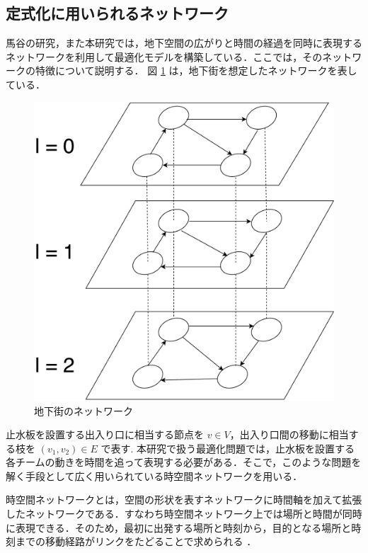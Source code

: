 \documentclass[a4paper,12pt,fleqn]{jarticle}
\begin{document}
\subsection{定式化に用いられるネットワーク}
馬谷の研究\cite{馬谷さん卒論}，また本研究では，地下空間の広がりと時間の経過を同時に表現するネットワークを利用して最適化モデルを構築している．ここでは，そのネットワークの特徴について説明する．
図 \ref{fig:nettowa-ku} は，地下街を想定したネットワークを表している．
\begin{figure}[H]
  \centering
  \includegraphics[keepaspectratio,scale=0.4]{nettowaku2.pdf}
  \caption{地下街のネットワーク}
  \label{fig:nettowa-ku}
\end{figure}

止水板を設置する出入り口に相当する節点を $v \in V$，出入り口間の移動に相当する枝を $(v_1,v_2) \in E$ で表す.
本研究で扱う最適化問題では，止水板を設置する各チームの動きを時間を追って表現する必要がある．そこで，このような問題を解く手段として広く用いられている時空間ネットワークを用いる．

時空間ネットワークとは，空間の形状を表すネットワークに時間軸を加えて拡張したネットワークである．すなわち時空間ネットワーク上では場所と時間が同時に表現できる．そのため，最初に出発する場所と時刻から，目的となる場所と時刻までの移動経路がリンクをたどることで求められる\cite{時空間ネットワークを用いたフライトパターンの列挙について} ．
\end{document}
